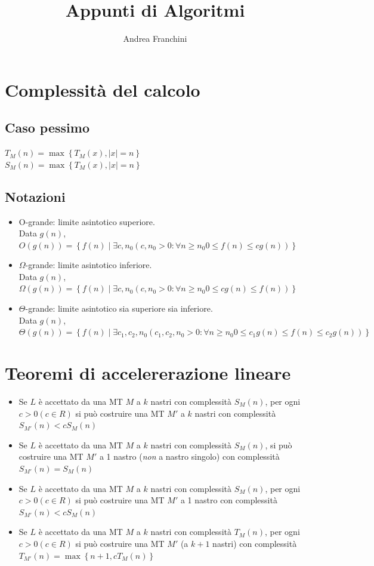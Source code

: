 \documentclass[10pt,a4paper]{article}
\author{Andrea Franchini}
\title{Appunti di Algoritmi}
\begin{document}
\section*{Complessit\`a del calcolo}
   \subsection*{Caso pessimo}
   $T_M(n) = \max\left\{T_M(x), |x|=n\right\}$\\
   $S_M(n) = \max\left\{T_M(x), |x|=n\right\}$
   \subsection*{Notazioni}
   \begin{itemize}
       \item O-grande: limite asintotico superiore.\\
       Data $g(n)$, $O(g(n)) = \left\{f(n) \mid \exists c,n_0 \left(c,n_0 > 0 : \forall n \ge n_0 0 \le f(n) \le cg(n)\right)\right\}$

       \item $\Omega$-grande: limite asintotico inferiore.\\
       Data $g(n)$, $\Omega(g(n)) = \left\{f(n) \mid \exists c,n_0 \left(c,n_0 > 0 : \forall n \ge n_0 0 \le cg(n)  \le f(n) \right)\right\}$

       \item $\Theta$-grande: limite asintotico sia superiore sia inferiore.\\
       Data $g(n)$, $\Theta(g(n)) = \left\{f(n) \mid \exists c_1,c_2,n_0 \left(c_1,c_2,n_0 > 0 : \forall n \ge n_0 0 \le c_1g(n) \le f(n) \le c_2g(n)\right)\right\}$
   \end{itemize}
\section*{Teoremi di accelererazione lineare}
\begin{itemize}
    \item Se $L$ \`e accettato da una MT $M$ a $k$ nastri con complessit\`a $S_M(n)$, per ogni $c > 0 (c \in R)$ si pu\`o costruire una MT $M'$ a $k$ nastri con complessit\`a $S_{M'}(n) < c S_M(n)$
    
    \item Se $L$ \`e accettato da una MT $M$ a $k$ nastri con complessit\`a $S_M(n)$, si pu\`o costruire una MT $M'$ a 1 nastro (\textit{non} a nastro singolo) con complessit\`a $S_{M'}(n) = S_M(n)$

    \item Se $L$ \`e accettato da una MT $M$ a $k$ nastri con complessit\`a $S_M(n)$, per ogni $c > 0 (c \in R)$ si pu\`o costruire una MT $M'$ a 1 nastro con complessit\`a $S_{M'}(n) < cS_M(n)$

    \item Se $L$ \`e accettato da una MT $M$ a $k$ nastri con complessit\`a $T_M(n)$, per ogni $c > 0 (c \in R)$ si pu\`o costruire una MT $M'$ (a $k+1$ nastri) con complessit\`a $T_{M'}(n) = \max \left\{n+1, cT_M(n)\right\}$
\end{itemize}
\end{document}
